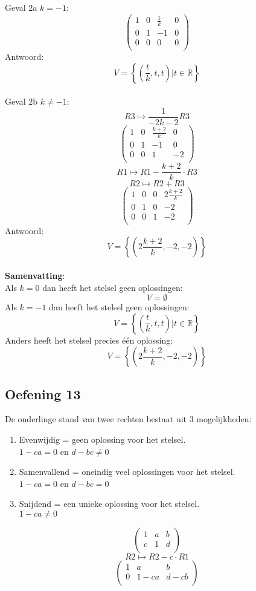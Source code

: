 \documentclass[lineaire_algebra_oplossingen.tex]{subfiles}
\begin{document}
Geval 2a $k=-1$:
\[
\begin{pmatrix}
1 & 0 & \frac{1}{k} & 0\\
0 & 1 & -1 & 0\\
0 & 0 & 0 & 0\\
\end{pmatrix}
\]
Antwoord:
\[
V=\left\lbrace\left(\frac{t}{k},t,t\right) | t \in \mathbb{R}\right\rbrace
\]\\
Geval 2b $k\neq-1$:
\[ R3 \longmapsto \frac{1}{-2k-2}R3\]
\[
\begin{pmatrix}
1 & 0 & \frac{k+2}{k} & 0\\
0 & 1 & -1 & 0\\
0 & 0 & 1 & -2\\
\end{pmatrix}
\]
\[ R1 \longmapsto R1 - \frac{k+2}{k}\cdot R3 \]
\[ R2 \longmapsto R2 + R3 \]
\[
\begin{pmatrix}
1 & 0 & 0 & 2\frac{k+2}{k}\\
0 & 1 & 0 & -2\\
0 & 0 & 1 & -2\\
\end{pmatrix}
\]
Antwoord:
\[
V=\left\lbrace\left(2\frac{k+2}{k},-2,-2\right)\right\rbrace
\]\\
\textbf{Samenvatting}:\\
Als $k=0$ dan heeft het stelsel geen oplossingen:
\[
V=\emptyset
\]
Als $k=-1$ dan heeft het stelsel geen oplossingen:
\[
V=\left\lbrace\left(\frac{t}{k},t,t\right) | t \in \mathbb{R}\right\rbrace
\]
Anders heeft het stelsel precies één oplossing:
\[
V=\left\lbrace\left(2\frac{k+2}{k},-2,-2\right)\right\rbrace
\]

\subsection{Oefening 13}
De onderlinge stand van twee rechten bestaat uit 3 mogelijkheden:
\begin{enumerate}
\item Evenwijdig = geen oplossing voor het stelsel.\\
$1-ca = 0$ en $ d -bc \neq 0$
\item Samenvallend = oneindig veel oplossingen voor het stelsel.\\
$1-ca = 0$ en $ d -bc = 0$
\item Snijdend = een unieke oplossing voor het stelsel.\\
$1-ca \neq 0$
\end{enumerate}
\[
\begin{pmatrix}
1 & a & b\\
c & 1 & d\\
\end{pmatrix}
\]
\[ R2 \longmapsto R2 - c \cdot R1\]
\[
\begin{pmatrix}
1 & a & b\\
0 & 1-ca & d-cb\\
\end{pmatrix}
\]
\end{document}
